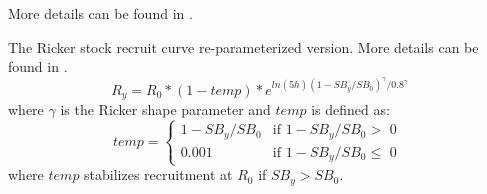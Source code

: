 More details can be found in \citet{punt-extending-2019}.

\hypertarget{Ricker2}{}
The Ricker stock recruit curve re-parameterized version. More details can be found in \citet{punt-extending-2019}.
\begin{equation}
R_y = R_0*(1-temp)*e^{ln(5h)(1-SB_y/SB_0)^{\gamma}/0.8^{\gamma}}
\end{equation}
where $\gamma$ is the Ricker shape parameter and $temp$ is defined as:
\begin{equation}
temp = 
\begin{cases}
1-SB_y/SB_0 & \text{if $1-SB_y/SB_0 >$ 0 }\\
0.001 & \text{if $1-SB_y/SB_0 \leq$ 0}
\end{cases}		
\end{equation}
where $temp$ stabilizes recruitment at $R_0$ if $SB_y > SB_0$. 

\hypertarget{SRRParam}{}

